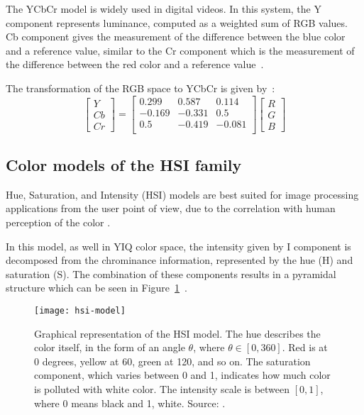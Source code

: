 The YCbCr model is widely used in digital videos. In this system, the Y component represents luminance, computed as a weighted sum of RGB values. Cb component gives the measurement of the difference between the blue color and a reference value, similar to the Cr component which is the measurement of the difference between the red color and a reference value~\citep{pedrini:08}.

The transformation of the RGB space to YCbCr is given by~\citep{pedrini:08}:\\
\begin{equation}
  \begin{bmatrix}
    Y \\ Cb \\ Cr
  \end{bmatrix} = 
  \begin{bmatrix}
     0.299 &  0.587 &  0.114 \\
    -0.169 & -0.331 &  0.5   \\
     0.5   & -0.419 & -0.081 \\
  \end{bmatrix}
  \begin{bmatrix}
    R \\ G \\ B
  \end{bmatrix}
\end{equation}


\subsection{Color models of the HSI family}
\label{sec:modelo_cores_hsi}

Hue, Saturation, and Intensity (HSI) models are best suited for image processing applications from the user point of view, due to the correlation with human perception of the color \citep{konstantinos:00}.

In this model, as well in YIQ color space, the intensity given by I component is decomposed from the chrominance information, represented by the hue (H) and saturation (S). The combination of these components results in a pyramidal structure which can be seen in Figure~\ref{fig:hsi-model}~\citep{konstantinos:00}.

\begin{figure}[!ht]
  \centering
  \texttt{[image: hsi-model]}
  \caption[Graphical representation of the HSI model]{Graphical representation of the HSI model. The hue describes the color itself, in the form of an angle $\theta$, where $\theta \in [0, 360]$. Red is at 0 degrees, yellow at 60, green at 120, and so on. The saturation component, which varies between 0 and 1, indicates how much color is polluted with white color. The intensity scale is between $[0, 1]$, where 0 means black and 1, white. Source: \citet{blackice:16}.}
  \label{fig:hsi-model} 
\end{figure}

